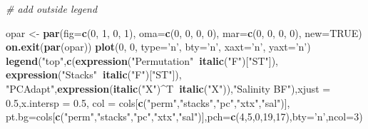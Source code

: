 \documentclass[]{article}
\newenvironment{Shaded}{\begin{snugshade}}{\end{snugshade}}
\newcommand{\KeywordTok}[1]{\textcolor[rgb]{0.13,0.29,0.53}{\textbf{#1}}}
\newcommand{\DataTypeTok}[1]{\textcolor[rgb]{0.13,0.29,0.53}{#1}}
\newcommand{\DecValTok}[1]{\textcolor[rgb]{0.00,0.00,0.81}{#1}}
\newcommand{\FloatTok}[1]{\textcolor[rgb]{0.00,0.00,0.81}{#1}}
\newcommand{\StringTok}[1]{\textcolor[rgb]{0.31,0.60,0.02}{#1}}
\newcommand{\CommentTok}[1]{\textcolor[rgb]{0.56,0.35,0.01}{\textit{#1}}}
\newcommand{\OtherTok}[1]{\textcolor[rgb]{0.56,0.35,0.01}{#1}}
\newcommand{\OperatorTok}[1]{\textcolor[rgb]{0.81,0.36,0.00}{\textbf{#1}}}
\newcommand{\NormalTok}[1]{#1}
\begin{document}
\begin{Shaded}
\begin{Highlighting}[]
\CommentTok{# add outside legend}

\NormalTok{opar <-}\StringTok{ }\KeywordTok{par}\NormalTok{(}\DataTypeTok{fig=}\KeywordTok{c}\NormalTok{(}\DecValTok{0}\NormalTok{, }\DecValTok{1}\NormalTok{, }\DecValTok{0}\NormalTok{, }\DecValTok{1}\NormalTok{), }\DataTypeTok{oma=}\KeywordTok{c}\NormalTok{(}\DecValTok{0}\NormalTok{, }\DecValTok{0}\NormalTok{, }\DecValTok{0}\NormalTok{, }\DecValTok{0}\NormalTok{),}
            \DataTypeTok{mar=}\KeywordTok{c}\NormalTok{(}\DecValTok{0}\NormalTok{, }\DecValTok{0}\NormalTok{, }\DecValTok{0}\NormalTok{, }\DecValTok{0}\NormalTok{), }\DataTypeTok{new=}\OtherTok{TRUE}\NormalTok{)}
\KeywordTok{on.exit}\NormalTok{(}\KeywordTok{par}\NormalTok{(opar))}
\KeywordTok{plot}\NormalTok{(}\DecValTok{0}\NormalTok{, }\DecValTok{0}\NormalTok{, }\DataTypeTok{type=}\StringTok{'n'}\NormalTok{, }\DataTypeTok{bty=}\StringTok{'n'}\NormalTok{, }\DataTypeTok{xaxt=}\StringTok{'n'}\NormalTok{, }\DataTypeTok{yaxt=}\StringTok{'n'}\NormalTok{)}
\KeywordTok{legend}\NormalTok{(}\StringTok{"top"}\NormalTok{,}\KeywordTok{c}\NormalTok{(}\KeywordTok{expression}\NormalTok{(}\StringTok{"Permutation"}\OperatorTok{~}\KeywordTok{italic}\NormalTok{(}\StringTok{"F"}\NormalTok{)[}\StringTok{"ST"}\NormalTok{]),}
         \KeywordTok{expression}\NormalTok{(}\StringTok{"Stacks"}\OperatorTok{~}\KeywordTok{italic}\NormalTok{(}\StringTok{"F"}\NormalTok{)[}\StringTok{"ST"}\NormalTok{]),}
         \StringTok{"PCAdapt"}\NormalTok{,}\KeywordTok{expression}\NormalTok{(}\KeywordTok{italic}\NormalTok{(}\StringTok{"X"}\NormalTok{)}\OperatorTok{^}\NormalTok{T}\OperatorTok{~}\KeywordTok{italic}\NormalTok{(}\StringTok{"X"}\NormalTok{)),}\StringTok{"Salinity BF"}\NormalTok{),}\DataTypeTok{xjust =} \FloatTok{0.5}\NormalTok{,}\DataTypeTok{x.intersp =} \FloatTok{0.5}\NormalTok{,}
       \DataTypeTok{col =}\NormalTok{ cols[}\KeywordTok{c}\NormalTok{(}\StringTok{"perm"}\NormalTok{,}\StringTok{"stacks"}\NormalTok{,}\StringTok{"pc"}\NormalTok{,}\StringTok{"xtx"}\NormalTok{,}\StringTok{"sal"}\NormalTok{)],}
       \DataTypeTok{pt.bg=}\NormalTok{cols[}\KeywordTok{c}\NormalTok{(}\StringTok{"perm"}\NormalTok{,}\StringTok{"stacks"}\NormalTok{,}\StringTok{"pc"}\NormalTok{,}\StringTok{"xtx"}\NormalTok{,}\StringTok{"sal"}\NormalTok{)],}\DataTypeTok{pch=}\KeywordTok{c}\NormalTok{(}\DecValTok{4}\NormalTok{,}\DecValTok{5}\NormalTok{,}\DecValTok{0}\NormalTok{,}\DecValTok{19}\NormalTok{,}\DecValTok{17}\NormalTok{),}\DataTypeTok{bty=}\StringTok{'n'}\NormalTok{,}\DataTypeTok{ncol=}\DecValTok{3}\NormalTok{)}
\end{Highlighting}
\end{Shaded}
\end{document}
